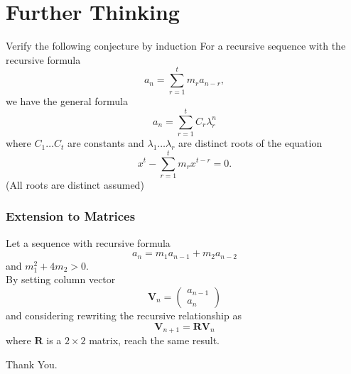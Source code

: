 \documentclass{beamer}
\theoremstyle{definition}
\theoremstyle{remark}
\begin{document}
\section{Further Thinking}
\begin{frame} 
  \begin{block}{Verify the following conjecture by induction}
     For a recursive sequence with the recursive formula \[
      a_n = \sum_{r=1}^t m_r a_{n-r},
     \]
     we have the general formula \[
       a_n = \sum_{r=1}^{t} C_r \lambda_r^n 
     \]
     where $C_1\dots C_t$ are constants and $\lambda_1\dots \lambda_r$
     are distinct roots of the equation \[
       x^t - \sum_{r=1}^t m_r x^{t-r} = 0.
     \] (All roots are distinct assumed)
  \end{block}
\end{frame}
\begin{frame}
  \frametitle{Extension to Matrices}
  \begin{problem}[3**]
    Let a sequence with recursive formula \[
      a_n = m_1 a_{n-1} + m_2 a_{n-2}
    \] 
    and $m_1^2 + 4m_2 > 0$. \\
    By setting column vector \[
       \textbf{V}_n = \begin{pmatrix}
         a_{n-1} \\ a_n 
       \end{pmatrix}
     \]
     and considering rewriting the recursive relationship
     as \[
       \textbf{V}_{n+1} = \textbf{R}\textbf{V}_n
     \] where $\textbf{R}$ is a $2 \times 2$
     matrix, reach the same result. 
\end{problem}
\end{frame}
\begin{frame}
  \huge{Thank You.}
\end{frame}
\end{document}

